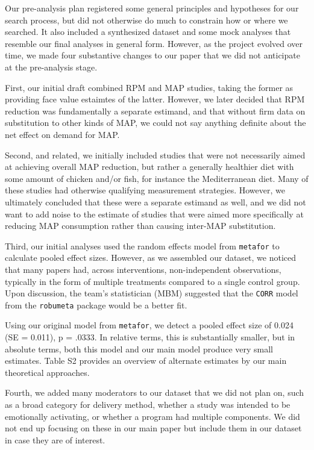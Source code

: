 \documentclass[sn-nature,pdflatex]{sn-jnl}
\begin{document}
Our pre-analysis plan registered some general principles and hypotheses
for our search process, but did not otherwise do much to constrain how
or where we searched. It also included a synthesized dataset and some
mock analyses that resemble our final analyses in general form. However,
as the project evolved over time, we made four substantive changes to
our paper that we did not anticipate at the pre-analysis stage.

First, our initial draft combined RPM and MAP studies, taking the former
as providing face value estaimtes of the latter. However, we later
decided that RPM reduction was fundamentally a separate estimand, and
that without firm data on substitution to other kinds of MAP, we could
not say anything definite about the net effect on demand for MAP.

Second, and related, we initially included studies that were not
necessarily aimed at achieving overall MAP reduction, but rather a
generally healthier diet with some amount of chicken and/or fish, for
instance the Mediterranean diet. Many of these studies had otherwise
qualifying measurement strategies. However, we ultimately concluded that
these were a separate estimand as well, and we did not want to add noise
to the estimate of studies that were aimed more specifically at reducing
MAP consumption rather than causing inter-MAP substitution.

Third, our initial analyses used the random effects model from
\texttt{metafor} to calculate pooled effect sizes. However, as we
assembled our dataset, we noticed that many papers had, across
interventions, non-independent observations, typically in the form of
multiple treatments compared to a single control group. Upon discussion,
the team's statistician (MBM) suggested that the \texttt{CORR} model
from the \texttt{robumeta} package would be a better fit.

Using our original model from \texttt{metafor}, we detect a pooled
effect size of 0.024 (SE = 0.011), p = .0333. In relative terms, this is
substantially smaller, but in absolute terms, both this model and our
main model produce very small estimates. Table S2 provides an overview
of alternate estimates by our main theoretical approaches.

Fourth, we added many moderators to our dataset that we did not plan on,
such as a broad category for delivery method, whether a study was
intended to be emotionally activating, or whether a program had multiple
components. We did not end up focusing on these in our main paper but
include them in our dataset in case they are of interest.
\end{document}
